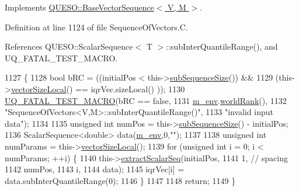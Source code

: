 Implements \hyperlink{class_q_u_e_s_o_1_1_base_vector_sequence_a62cb96f153a8608ef1727265a734aacb}{Q\-U\-E\-S\-O\-::\-Base\-Vector\-Sequence$<$ V, M $>$}.



Definition at line 1124 of file Sequence\-Of\-Vectors.\-C.



References Q\-U\-E\-S\-O\-::\-Scalar\-Sequence$<$ T $>$\-::sub\-Inter\-Quantile\-Range(), and U\-Q\-\_\-\-F\-A\-T\-A\-L\-\_\-\-T\-E\-S\-T\-\_\-\-M\-A\-C\-R\-O.


\begin{DoxyCode}
1127 \{
1128   \textcolor{keywordtype}{bool} bRC = ((initialPos              <  this->\hyperlink{class_q_u_e_s_o_1_1_sequence_of_vectors_a0224bd3e961d86af5d2886301c0c2b86}{subSequenceSize}()) &&
1129               (this->\hyperlink{class_q_u_e_s_o_1_1_base_vector_sequence_a2fefedf9e5b90f22881103b3f92555f6}{vectorSizeLocal}() == iqrVec.sizeLocal()     ));
1130   \hyperlink{_defines_8h_a56d63d18d0a6d45757de47fcc06f574d}{UQ\_FATAL\_TEST\_MACRO}(bRC == \textcolor{keyword}{false},
1131                       \hyperlink{class_q_u_e_s_o_1_1_base_vector_sequence_a8e8824d2a63c5a43bcc6473e3a0491e8}{m\_env}.\hyperlink{class_q_u_e_s_o_1_1_base_environment_a78b57112bbd0e6dd0e8afec00b40ffa7}{worldRank}(),
1132                       \textcolor{stringliteral}{"SequenceOfVectors<V,M>::subInterQuantileRange()"},
1133                       \textcolor{stringliteral}{"invalid input data"});
1134 
1135   \textcolor{keywordtype}{unsigned} \textcolor{keywordtype}{int} numPos = this->\hyperlink{class_q_u_e_s_o_1_1_sequence_of_vectors_a0224bd3e961d86af5d2886301c0c2b86}{subSequenceSize}() - initialPos;
1136   ScalarSequence<double> data(\hyperlink{class_q_u_e_s_o_1_1_base_vector_sequence_a8e8824d2a63c5a43bcc6473e3a0491e8}{m\_env},0,\textcolor{stringliteral}{""});
1137 
1138   \textcolor{keywordtype}{unsigned} \textcolor{keywordtype}{int} numParams = this->\hyperlink{class_q_u_e_s_o_1_1_base_vector_sequence_a2fefedf9e5b90f22881103b3f92555f6}{vectorSizeLocal}();
1139   \textcolor{keywordflow}{for} (\textcolor{keywordtype}{unsigned} \textcolor{keywordtype}{int} i = 0; i < numParams; ++i) \{
1140     this->\hyperlink{class_q_u_e_s_o_1_1_sequence_of_vectors_ac977b3b26a6af2ae727671f1246262fd}{extractScalarSeq}(initialPos,
1141                            1, \textcolor{comment}{// spacing}
1142                            numPos,
1143                            i,
1144                            data);
1145     iqrVec[i] = data.subInterQuantileRange(0);
1146   \}
1147 
1148   \textcolor{keywordflow}{return};
1149 \}
\end{DoxyCode}
